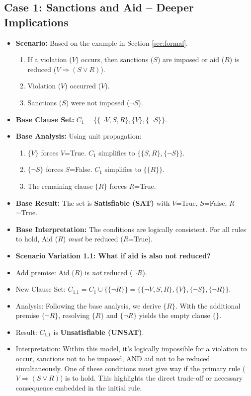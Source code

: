 \documentclass[11pt, a4paper]{article}
\begin{document}
\subsection*{Case 1: Sanctions and Aid – Deeper Implications}
\begin{itemize}
    \item \textbf{Scenario:} Based on the example in Section \ref{sec:formal}.
    \begin{enumerate}
        \item If a violation ($V$) occurs, then sanctions ($S$) are imposed or aid ($R$) is reduced ($V \Rightarrow (S \vee R)$).
        \item Violation ($V$) occurred ($V$).
        \item Sanctions ($S$) were not imposed ($\neg S$).
    \end{enumerate}
    \item \textbf{Base Clause Set:} $C_1 = \{\{\neg V, S, R\}, \{V\}, \{\neg S\}\}$.
    \item \textbf{Base Analysis:} Using unit propagation:
    \begin{enumerate}
        \item $\{V\}$ forces $V$=True. $C_1$ simplifies to $\{\{S, R\}, \{\neg S\}\}$.
        \item $\{\neg S\}$ forces $S$=False. $C_1$ simplifies to $\{\{R\}\}$.
        \item The remaining clause $\{R\}$ forces $R$=True.
    \end{enumerate}
    \item \textbf{Base Result:} The set is \textbf{Satisfiable (SAT)} with $V$=True, $S$=False, $R$=True.
    \item \textbf{Base Interpretation:} The conditions are logically consistent. For all rules to hold, Aid ($R$) \textit{must} be reduced ($R$=True).

    \item \textbf{Scenario Variation 1.1: What if aid is also not reduced?}
        \item Add premise: Aid ($R$) is \textit{not} reduced ($\neg R$).
        \item New Clause Set: $C_{1.1} = C_1 \cup \{\{\neg R\}\} = \{\{\neg V, S, R\}, \{V\}, \{\neg S\}, \{\neg R\}\}$.
        \item Analysis: Following the base analysis, we derive $\{R\}$. With the additional premise $\{\neg R\}$, resolving $\{R\}$ and $\{\neg R\}$ yields the empty clause $\{\}$.
        \item Result: $C_{1.1}$ is \textbf{Unsatisfiable (UNSAT)}.
        \item Interpretation: Within this model, it's logically impossible for a violation to occur, sanctions not to be imposed, AND aid not to be reduced simultaneously. One of these conditions must give way if the primary rule ($V \Rightarrow (S \vee R)$) is to hold. This highlights the direct trade-off or necessary consequence embedded in the initial rule.


\end{itemize}
\end{document}

